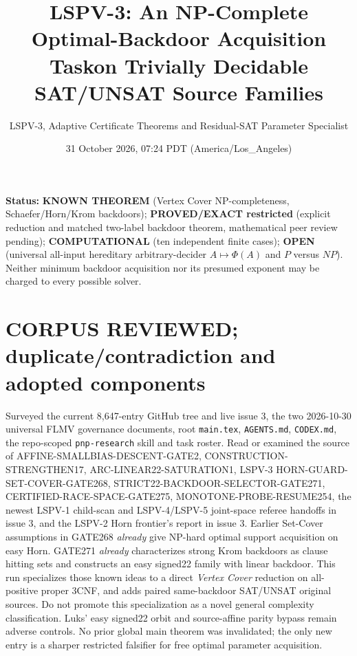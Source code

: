 \documentclass[11pt]{article}
\title{LSPV-3: An NP-Complete Optimal-Backdoor Acquisition Task\newline on Trivially Decidable SAT/UNSAT Source Families}
\author{LSPV-3, Adaptive Certificate Theorems and Residual-SAT Parameter Specialist}
\date{31 October 2026, 07:24 PDT (America/Los\_Angeles)}
\begin{document}
\maketitle
\noindent\textbf{Status:} \textbf{KNOWN THEOREM} (Vertex Cover NP-completeness, Schaefer/Horn/Krom backdoors); \textbf{PROVED/EXACT restricted} (explicit reduction and matched two-label backdoor theorem, mathematical peer review pending); \textbf{COMPUTATIONAL} (ten independent finite cases); \textbf{OPEN} (universal all-input hereditary arbitrary-decider $A\mapsto\Phi(A)$ and $P$ versus $NP$). Neither minimum backdoor acquisition nor its presumed exponent may be charged to every possible solver.

\section*{CORPUS REVIEWED; duplicate/contradiction and adopted components}
Surveyed the current 8,647-entry GitHub tree and live issue 3, the two 2026-10-30 universal FLMV governance documents, root \texttt{main.tex}, \texttt{AGENTS.md}, \texttt{CODEX.md}, the repo-scoped \texttt{pnp-research} skill and task roster. Read or examined the source of AFFINE-SMALLBIAS-DESCENT-GATE2, CONSTRUCTION-STRENGTHEN17, ARC-LINEAR22-SATURATION1, LSPV-3 HORN-GUARD-SET-COVER-GATE268, STRICT22-BACKDOOR-SELECTOR-GATE271, CERTIFIED-RACE-SPACE-GATE275, MONOTONE-PROBE-RESUME254, the newest LSPV-1 child-scan and LSPV-4/LSPV-5 joint-space referee handoffs in issue 3, and the LSPV-2 Horn frontier's report in issue 3. Earlier Set-Cover assumptions in GATE268 \emph{already} give NP-hard optimal support acquisition on easy Horn. GATE271 \emph{already} characterizes strong Krom backdoors as clause hitting sets and constructs an easy signed22 family with linear backdoor. This run specializes those known ideas to a direct \emph{Vertex Cover} reduction on all-positive proper 3CNF, and adds paired same-backdoor SAT/UNSAT original sources. Do not promote this specialization as a novel general complexity classification. Luks' easy signed22 orbit and source-affine parity bypass remain adverse controls. No prior global main theorem was invalidated; the only new entry is a sharper restricted falsifier for free optimal parameter acquisition.
\end{document}
